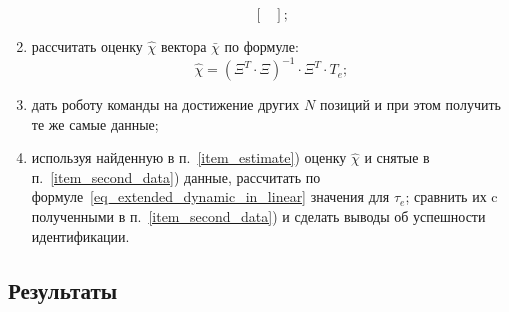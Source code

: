 \begin{enumerate}
\begin{equation}
\begin{bmatrix}
            \end{bmatrix}\!\!;
        \end{equation}
    \item \label{item_estimate}рассчитать оценку $\hat{\chi}$ вектора $\bar\chi$ по формуле:
        \begin{equation}
            \hat\chi = ( \Xi^T \!\!\cdot \Xi)^{-1} \cdot \Xi^T \cdot T_e;
        \end{equation}
    \item \label{item_second_data}дать роботу команды на достижение других $N$ позиций и при этом получить те же самые данные;
    \item используя найденную в п.~\ref{item_estimate}) оценку $\hat{\chi}$ и снятые в п.~\ref{item_second_data}) данные, рассчитать по формуле~\eqref{eq_extended_dynamic_in_linear} значения для $\tau_e$; сравнить их c полученными в п.~\ref{item_second_data}) и сделать выводы об успешности идентификации.
\end{enumerate}

\subsection{Результаты}
\newpage
